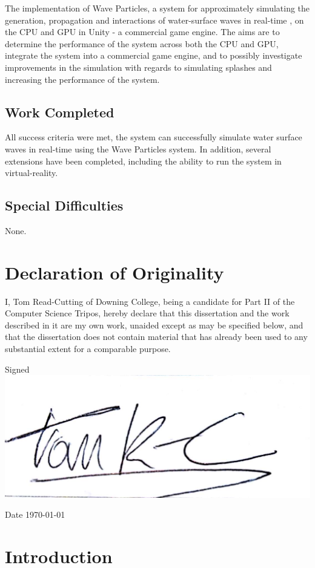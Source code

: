 \documentclass[12pt,a4paper,twoside]{report}
\begin{document}
The implementation of Wave Particles, a system for approximately simulating the
generation, propagation and interactions of water-surface waves in real-time
\cite{Yuksel2007}, on the CPU and GPU in Unity - a commercial game engine. The
aims are to determine the performance of the system across both the CPU and
GPU, integrate the system into a commercial game engine, and to possibly
investigate improvements in the simulation with regards to simulating splashes
and increasing the performance of the system.

\section*{Work Completed}

All success criteria were met, the system can successfully simulate water
surface waves in real-time using the Wave Particles system. In addition, several
extensions have been completed, including the ability to run the system in
virtual-reality.

\section*{Special Difficulties}

None.

\chapter*{Declaration of Originality}

I, Tom Read-Cutting of Downing College, being a candidate for Part II of the
Computer Science Tripos, hereby declare that this dissertation and the work
described in it are my own work, unaided except as may be specified below, and
that the dissertation does not contain material that has already been used to
any substantial extent for a comparable purpose.

Signed \\

\includegraphics[width=0.25\linewidth]{signature}

Date \today

\tableofcontents

\listoffigures

\chapter{Introduction}
\end{document}
